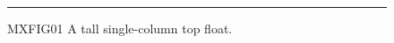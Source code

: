 \documentclass[twocolumn]{article}
\begin{document}
\begin{figure}[t]
\centering
\rule{.7\columnwidth}{340pt}
\caption{\mbox{MXFIG01} A tall single-column top float.}
\end{figure}
\begin{wideband}
\end{wideband}
\end{document}
